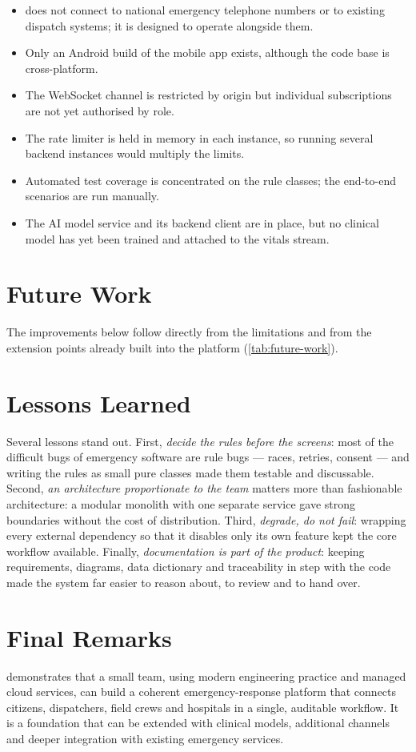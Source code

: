 \begin{itemize}
  \item \ProjectName{} does not connect to national emergency telephone numbers or to existing dispatch systems; it is
        designed to operate alongside them.
  \item Only an Android build of the mobile app exists, although the code base is cross-platform.
  \item The WebSocket channel is restricted by origin but individual subscriptions are not yet authorised by role.
  \item The rate limiter is held in memory in each instance, so running several backend instances would multiply the limits.
  \item Automated test coverage is concentrated on the rule classes; the end-to-end scenarios are run manually.
  \item The AI model service and its backend client are in place, but no clinical model has yet been trained and attached
        to the vitals stream.
\end{itemize}

\section{Future Work}\label{sec:future-work}

The improvements below follow directly from the limitations and from the extension points already built into the platform
(\cref{tab:future-work}).



\section{Lessons Learned}

Several lessons stand out. First, \emph{decide the rules before the screens}: most of the difficult bugs of emergency
software are rule bugs --- races, retries, consent --- and writing the rules as small pure classes made them testable and
discussable. Second, \emph{an architecture proportionate to the team} matters more than fashionable architecture: a modular
monolith with one separate service gave strong boundaries without the cost of distribution. Third, \emph{degrade, do not
fail}: wrapping every external dependency so that it disables only its own feature kept the core workflow available.
Finally, \emph{documentation is part of the product}: keeping requirements, diagrams, data dictionary and traceability in step
with the code made the system far easier to reason about, to review and to hand over.

\section{Final Remarks}

\ProjectName{} demonstrates that a small team, using modern engineering practice and managed cloud services, can build a coherent
emergency-response platform that connects citizens, dispatchers, field crews and hospitals in a single, auditable workflow.
It is a foundation that can be extended with clinical models, additional channels and deeper integration with existing
emergency services.
